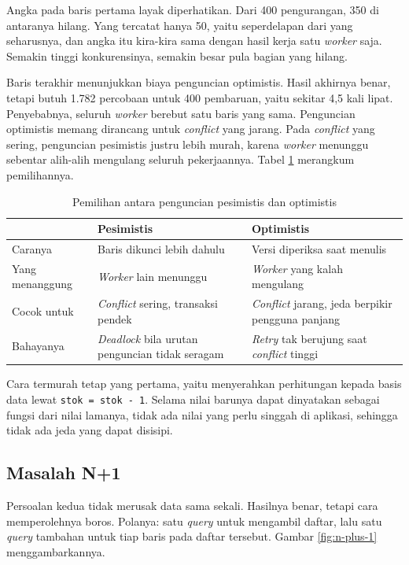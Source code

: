 Angka pada baris pertama layak diperhatikan. Dari 400 pengurangan, 350 di
antaranya hilang. Yang tercatat hanya 50, yaitu seperdelapan dari yang
seharusnya, dan angka itu kira-kira sama dengan hasil kerja satu \textit{worker} saja.
Semakin tinggi konkurensinya, semakin besar pula bagian yang hilang.

Baris terakhir menunjukkan biaya penguncian optimistis. Hasil akhirnya benar,
tetapi butuh 1.782 percobaan untuk 400 pembaruan, yaitu sekitar 4,5 kali lipat.
Penyebabnya, seluruh \textit{worker} berebut satu baris yang sama. Penguncian
optimistis memang dirancang untuk \textit{conflict} yang jarang. Pada \textit{conflict} yang
sering, penguncian pesimistis justru lebih murah, karena \textit{worker} menunggu
sebentar alih-alih mengulang seluruh pekerjaannya. Tabel \ref{tab:kunci}
merangkum pemilihannya.

\begin{table}[!htb]
  \centering
  \caption{Pemilihan antara penguncian pesimistis dan optimistis}
  \label{tab:kunci}
  \begin{tabularx}{\textwidth}{lXX}
    \hline
     & \textbf{Pesimistis} & \textbf{Optimistis} \\
    \hline
    Caranya & Baris dikunci lebih dahulu & Versi diperiksa saat menulis \\
    \hline
    Yang menanggung & \textit{Worker} lain menunggu & \textit{Worker} yang kalah mengulang \\
    \hline
    Cocok untuk & \textit{Conflict} sering, transaksi pendek & \textit{Conflict} jarang, jeda berpikir pengguna panjang \\
    \hline
    Bahayanya & \textit{Deadlock} bila urutan penguncian tidak seragam & \textit{Retry} tak berujung saat \textit{conflict} tinggi \\
    \hline
  \end{tabularx}
\end{table}

Cara termurah tetap yang pertama, yaitu menyerahkan perhitungan kepada basis
data lewat \texttt{stok = stok - 1}. Selama nilai barunya dapat dinyatakan
sebagai fungsi dari nilai lamanya, tidak ada nilai yang perlu singgah di
aplikasi, sehingga tidak ada jeda yang dapat disisipi.

\subsection*{Masalah N+1}

Persoalan kedua tidak merusak data sama sekali. Hasilnya benar, tetapi cara
memperolehnya boros. Polanya: satu \textit{query} untuk mengambil daftar, lalu satu
\textit{query} tambahan untuk tiap baris pada daftar tersebut. Gambar \ref{fig:n-plus-1}
menggambarkannya.

